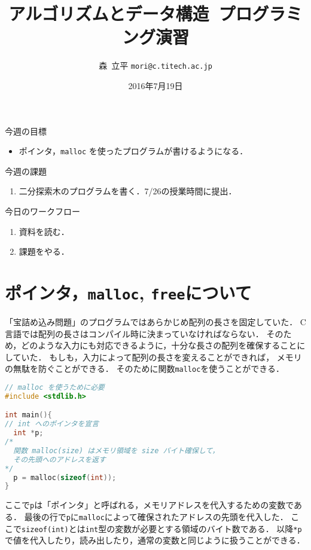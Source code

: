 \documentclass[a4paper,twoside,onecolumn,openany,article]{memoir}
\title{アルゴリズムとデータ構造~プログラミング演習}
\date{2016年7月19日}
\author{森~立平 \texttt{mori@c.titech.ac.jp}}
\theoremstyle{remark}
\begin{document}
\maketitle

\noindent
今週の目標
\begin{itemize}
\item ポインタ，\texttt{malloc} を使ったプログラムが書けるようになる．
\end{itemize}

\noindent
今週の課題
\begin{enumerate}
\item 二分探索木のプログラムを書く．7/26の授業時間に提出．
\end{enumerate}

\vspace{.5em}
\noindent
今日のワークフロー
\begin{enumerate}
\item 資料を読む．
\item 課題をやる．
\end{enumerate}

\section{ポインタ，\texttt{malloc}, \texttt{free}について}
「宝詰め込み問題」のプログラムではあらかじめ配列の長さを固定していた．
C言語では配列の長さはコンパイル時に決まっていなければならない．
そのため，どのような入力にも対応できるように，十分な長さの配列を確保することにしていた．
もしも，入力によって配列の長さを変えることができれば，
メモリの無駄を防ぐことができる．
そのために関数\texttt{malloc}を使うことができる．

\begin{lstlisting}[basicstyle=\ttfamily\small,showstringspaces=false,language=C,frame=single]
// malloc を使うために必要
#include <stdlib.h>

int main(){
// int へのポインタを宣言
  int *p;
/*
  関数 malloc(size) はメモリ領域を size バイト確保して，
  その先頭へのアドレスを返す
*/
  p = malloc(sizeof(int));
}
\end{lstlisting}
ここで\texttt{p}は「ポインタ」と呼ばれる，メモリアドレスを代入するための変数である．
最後の行で\texttt{p}に\texttt{malloc}によって確保されたアドレスの先頭を代入した．
ここで\texttt{sizeof(int)}とは\texttt{int}型の変数が必要とする領域のバイト数である．
以降\texttt{*p}で値を代入したり，読み出したり，通常の変数と同じように扱うことができる．
\end{document}
